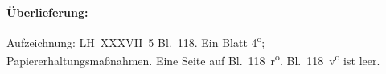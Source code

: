 %
%
%
%
%
\frenchspacing%
%
\begin{ledgroupsized}[r]{120mm}%
\footnotesize%
\pstart%
\noindent\textbf{Überlieferung:}%
\pend%
\end{ledgroupsized}%
\begin{ledgroupsized}[r]{114mm}%
\footnotesize%
\pstart%
\parindent -6mm%
%
Aufzeichnung:
LH~XXXVII~5 Bl.~118.
Ein Blatt 4\textsuperscript{o};
Papiererhaltungsmaßnahmen.
Eine Seite auf Bl.~118~r\textsuperscript{o}\!.
Bl.~118~v\textsuperscript{o} ist leer.
\pend%
\end{ledgroupsized}%
%
\vspace*{5mm}%
